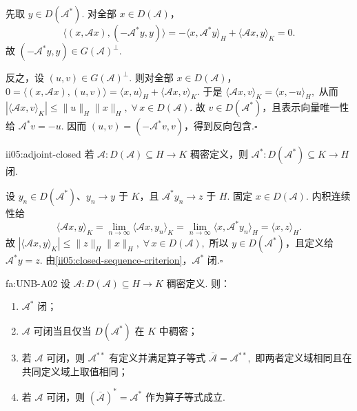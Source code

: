 \begin{FAProof}
先取 \(\displaystyle y\in D(\mathcal A^*)\). 对全部 \(\displaystyle x\in D(\mathcal A)\)，
\[
\langle(x,\mathcal Ax),(-\mathcal A^*y,y)\rangle
=
-\langle x,\mathcal A^*y\rangle_H
+
\langle\mathcal Ax,y\rangle_K
=
0.
\]
故 \(\displaystyle(-\mathcal A^*y,y)\in G(\mathcal A)^\perp\).

反之，设 \(\displaystyle(u,v)\in G(\mathcal A)^\perp\). 则对全部 \(\displaystyle x\in D(\mathcal A)\)，
\(\displaystyle 0 = \langle(x,\mathcal Ax),(u,v)\rangle = \langle x,u\rangle_H+\langle\mathcal Ax,v\rangle_K.\)
于是
\(\displaystyle \langle\mathcal Ax,v\rangle_K = \langle x,-u\rangle_H,\)
从而
\(\displaystyle |\langle\mathcal Ax,v\rangle_K| \leqslant \|u\|_H\|x\|_H ,\;\forall\,x\in D(\mathcal A).\)
故 \(\displaystyle v\in D(\mathcal A^*)\)，且表示向量唯一性给 \(\displaystyle\mathcal A^*v=-u\). 因而 \(\displaystyle(u,v)=(-\mathcal A^*v,v)\)，得到反向包含.\hfill\(\square\)
\end{FAProof}

\begin{FAProposition}[A][无界伴随总是闭]{ii05:adjoint-closed}
若 \(\displaystyle\mathcal A:D(\mathcal A)\subseteq H\to K\) 稠密定义，则
\(\displaystyle \mathcal A^*:D(\mathcal A^*)\subseteq K\to H\)
闭.
\end{FAProposition}

\begin{FAProof}
设 \(\displaystyle y_n\in D(\mathcal A^*)\)、\(\displaystyle y_n\to y\) 于 \(\displaystyle K\)，且 \(\displaystyle\mathcal A^*y_n\to z\) 于 \(\displaystyle H\). 固定 \(\displaystyle x\in D(\mathcal A)\). 内积连续性给
\[
\langle\mathcal Ax,y\rangle_K
=
\lim_{n\to\infty}\langle\mathcal Ax,y_n\rangle_K
=
\lim_{n\to\infty}\langle x,\mathcal A^*y_n\rangle_H
=
\langle x,z\rangle_H.
\]
故
\(\displaystyle |\langle\mathcal Ax,y\rangle_K| \leqslant \|z\|_H\|x\|_H ,\;\forall\,x\in D(\mathcal A),\)
所以 \(\displaystyle y\in D(\mathcal A^*)\)，且定义给 \(\displaystyle\mathcal A^*y=z\). 由\autoref{ii05:closed-sequence-criterion}，\(\displaystyle\mathcal A^*\) 闭.\hfill\(\square\)
\end{FAProof}

\begin{FATheorem}{fa:UNB-A02}
设
\(\displaystyle \mathcal A:D(\mathcal A)\subseteq H\to K\)
稠密定义. 则：
\begin{enumerate}[label=\textnormal{(\roman*)}]
\item \(\displaystyle\mathcal A^*\) 闭；
\item \(\displaystyle\mathcal A\) 可闭当且仅当 \(\displaystyle D(\mathcal A^*)\) 在 \(\displaystyle K\) 中稠密；
\item 若 \(\displaystyle\mathcal A\) 可闭，则 \(\displaystyle\mathcal A^{**}\) 有定义并满足算子等式
\(\displaystyle \overline{\mathcal A}=\mathcal A^{**},\)
即两者定义域相同且在共同定义域上取值相同；
\item 若 \(\displaystyle\mathcal A\) 可闭，则
\(\displaystyle (\overline{\mathcal A})^*=\mathcal A^*\)
作为算子等式成立.
\end{enumerate}
\end{FATheorem}

